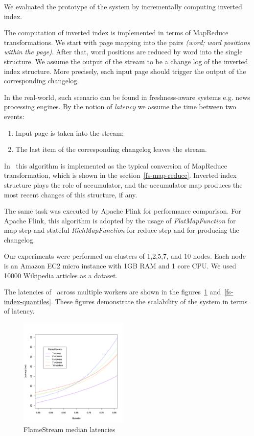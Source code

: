 
\label{fs-experiments-section}

We evaluated the prototype of the system by incrementally computing inverted index.

The computation of inverted index is implemented in terms of MapReduce transformations. We start with page mapping into the pairs {\it (word; word positions within the page)}. After that, word positions are reduced by word into the single structure. We assume the output of the stream to be a change log of the inverted index structure. More precisely, each input page should trigger the output of the corresponding changelog. 

In the real-world, such scenario can be found in freshness-aware systems e.g. news processing engines. By the notion of {\it latency} we assume the time between two events: 
\begin{enumerate}
    \item Input page is taken into the stream;
    \item The last item of the corresponding changelog leaves the stream.
\end{enumerate}

In \FlameStream\ this algorithm is implemented as the typical conversion of MapReduce transformation, which is shown in the section~\ref{fs-map-reduce}. Inverted index structure plays the role of accumulator, and the accumulator map produces the most recent changes of this structure, if any.

The same task was executed by Apache Flink for performance comparison. For Apache Flink, this algorithm is adopted by the usage of {\it FlatMapFunction} for map step and stateful {\it RichMapFunction} for reduce step and for producing the changelog.

Our experiments were performed on clusters of 1,2,5,7, and 10 nodes. Each node is an Amazon EC2 micro instance with 1GB RAM and 1 core CPU. We used 10000 Wikipedia articles as a dataset. 

The latencies of \FlameStream\ across multiple workers are shown in the figures~\ref{fs-index-median} and~\ref{fs-index-quantiles}. These figures demonstrate the scalability of the system in terms of latency.

\begin{figure}[htbp]
  \centering
  \includegraphics[width=0.48\textwidth]{pics/fs-index-median}
  \caption{FlameStream median latencies}
  \label {fs-index-median}
\end{figure}

